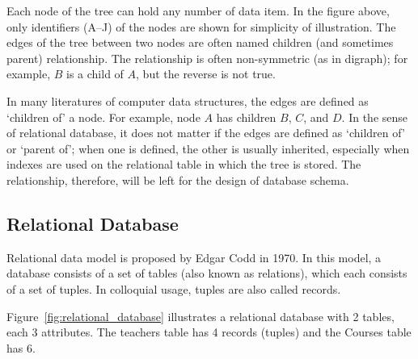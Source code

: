 Each node of the tree can hold any number of data item. In the figure above, only identifiers (A--J) of the nodes are shown for simplicity of illustration. The edges of the tree between two nodes are often named children (and sometimes parent) relationship. The relationship is often non-symmetric (as in digraph); for example, $B$ is a child of $A$, but the reverse is not true.

In many literatures of computer data structures, the edges are defined as `children of' a node. For example, node $A$ has children $B$, $C$, and $D$. In the sense of relational database, it does not matter if the edges are defined as `children of' or `parent of'; when one is defined, the other is usually inherited, especially when indexes are used on the relational table in which the tree is stored. The relationship, therefore, will be left for the design of database schema.

\subsection{Relational Database}

Relational data model is proposed by Edgar Codd in 1970\cite{DBLP:journals/cacm/Codd70}. In this model, a database consists of a set of tables (also known as relations), which each consists of a set of tuples. In colloquial usage, tuples are also called records.

Figure~\ref{fig:relational_database} illustrates a relational database with 2 tables, each 3 attributes. The teachers table has 4 records (tuples) and the Courses table has 6.

\begin{table}[!h]
\centering
\caption{A Relational Database\label{fig:relational_database}}
\end{table}


